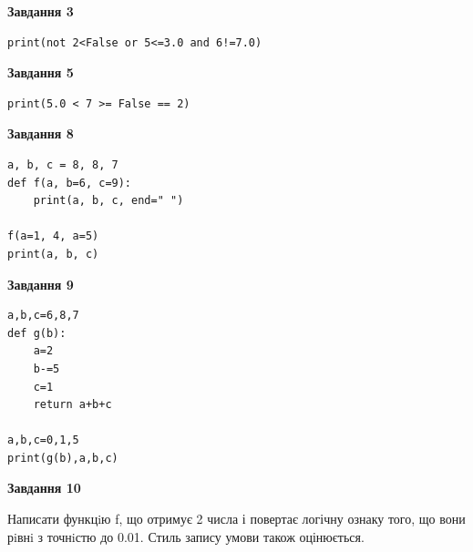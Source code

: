 \documentclass[12pt, ukrainian]{article}
\begin{document}
{\begin {large}
\begin{minipage}[t]{7.5cm}
\end{minipage}
\vline \hspace{6mm}
\begin{minipage}[t]{10.5cm}

\begin{center}
\textbf{Завдання 3}
\end{center}

\begin{verbatim}
print(not 2<False or 5<=3.0 and 6!=7.0)
\end{verbatim}



\begin{center}
\textbf{Завдання 5}
\end{center}

\begin{verbatim}
print(5.0 < 7 >= False == 2)
\end{verbatim}



\begin{center}
\textbf{Завдання 8}
\end{center}

\begin{verbatim}
a, b, c = 8, 8, 7
def f(a, b=6, c=9):
    print(a, b, c, end=" ")

f(a=1, 4, a=5)
print(a, b, c)
\end{verbatim}



\begin{center}
\textbf{Завдання 9}
\end{center}

\begin{verbatim}
a,b,c=6,8,7
def g(b):
    a=2
    b-=5
    c=1
    return a+b+c

a,b,c=0,1,5
print(g(b),a,b,c)
\end{verbatim}



\begin{center}
\textbf{Завдання 10}
\end{center}

Написати функцiю f, що отримує 2 числа і повертає логічну ознаку того, що вони рiвнi з точнiстю до 0.01. Стиль запису умови також оцінюється.\par

\end{minipage}

\end {large}}
\newpage
\end{document}
